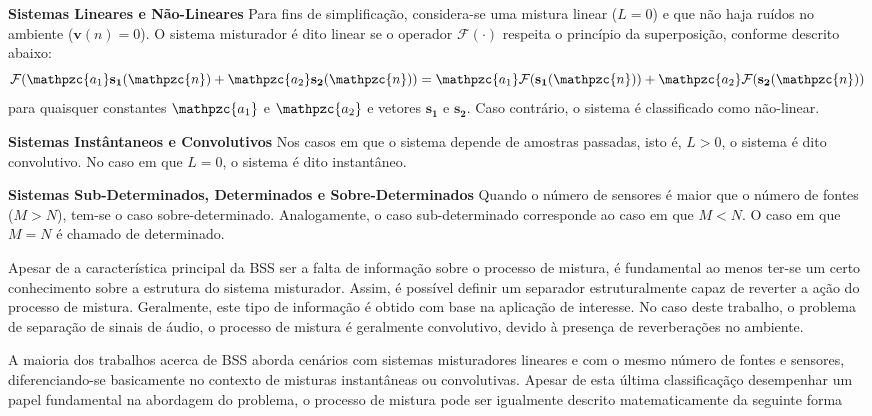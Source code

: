     \textbf{Sistemas Lineares e Não-Lineares} Para fins de simplificação, considera-se uma mistura linear ($L=0$) e que não haja ruídos no ambiente ($\mathbf{v}(n)=0$). O sistema misturador é dito linear se o operador  $\mathcal{F}(\cdot)$ respeita o princípio da superposição, conforme descrito abaixo:
        \begin{equation}\label{eq:linearity}
            \mathcal{F}(\mathpzc{a_1}\mathbf{s_1}(\mathpzc{n}) + \mathpzc{a_2}\mathbf{s_2}(\mathpzc{n})) = \mathpzc{a_1}\mathcal{F}(\mathbf{s_1}(\mathpzc{n})) + \mathpzc{a_2}\mathcal{F}(\mathbf{s_2}(\mathpzc{n}))
        \end{equation}
    para quaisquer constantes $\mathpzc{a_1}$ e $\mathpzc{a_2}$ e vetores $\mathbf{s_1}$ e $\mathbf{s_2}$. Caso contrário, o sistema é classificado como não-linear. 
    
     \textbf{Sistemas Instântaneos e Convolutivos} Nos casos em que o sistema depende de amostras passadas, isto é, $L>0$, o sistema é dito convolutivo. No caso em que $L=0$, o sistema é dito instantâneo.
    
     \textbf{Sistemas Sub-Determinados, Determinados e Sobre-Determinados} Quando o número de sensores é maior que o número de fontes ($M>N$), tem-se o caso sobre-determinado. Analogamente, o caso sub-determinado corresponde ao caso em que $M<N$. O caso em que $M=N$ é chamado de determinado.
     
     Apesar de a característica principal da BSS ser a falta de informação sobre o processo de mistura, é fundamental ao menos ter-se um certo conhecimento sobre a estrutura do sistema misturador. Assim, é possível definir um separador estruturalmente capaz de reverter a ação do processo de mistura. Geralmente, este tipo de informação é obtido com base na aplicação de interesse. No caso deste trabalho, o problema de separação de sinais de áudio, o processo de mistura é geralmente convolutivo, devido à presença de reverberações no ambiente.
     
     A maioria dos trabalhos acerca de BSS aborda cenários com sistemas misturadores lineares e com o mesmo número de fontes e sensores, diferenciando-se basicamente no contexto de misturas instantâneas ou convolutivas. Apesar de esta última classificaçãço desempenhar um papel fundamental na abordagem do problema, o  processo de mistura pode ser igualmente descrito matematicamente da seguinte forma
     
